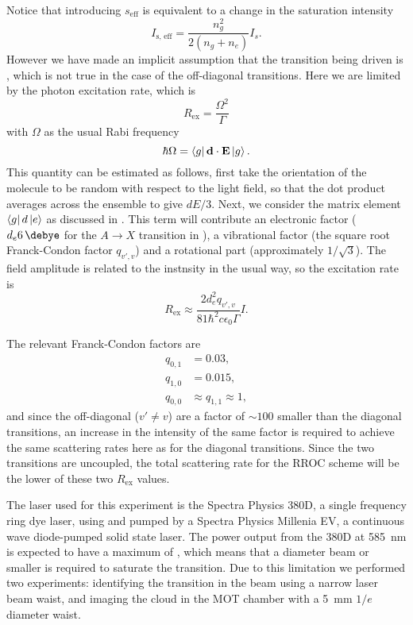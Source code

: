Notice that introducing $s_\text{eff}$ is equivalent to a change in the
saturation intensity
%
\begin{equation}
  I_\text{s, eff} = \frac{n_g^2}{2(n_g + n_e)}I_s.
\end{equation}
%
However we have made an implicit assumption that the transition being driven is
, which is not true in the case of the
off-diagonal transitions. Here we are limited by the photon excitation rate,
which is
%
\begin{equation}
  R_\text{ex} = \frac{\Omega^2}{\Gamma}
\end{equation}
%
with $\Omega$ as the usual Rabi frequency
%
\begin{equation}
  \hbar \Omega = \bra{g}\mathbf{d}\cdot\mathbf{E}\ket{g}.
\end{equation}
%
%
This quantity can be estimated as follows, first take the orientation of the
molecule to be random with respect to the light field, so that the dot product
averages across the ensemble to give $dE/3$. Next, we consider the matrix
element $\bra{g}d\ket{e}$ as discussed in .
This term will contribute an electronic factor ($d_e\SI{6}{\debye}$
for the $A\rightarrow X$ transition in \CaF{}), a vibrational factor (the
square root Franck-Condon factor $q_{v',v}$) and a rotational part
(approximately $1/\sqrt{3}$). The field amplitude is related to the instnsity
in the usual way, so the excitation rate is
%
\begin{equation}
  R_\text{ex} \approx \frac{2 d_e^2 q_{v',v}}{81 \hbar^2 c \epsilon_0 \Gamma}I.
\end{equation}

The relevant Franck-Condon factors are
%
\begin{align}
  q_{0,1} &= 0.03,\\
  q_{1,0} &= 0.015,\\
  q_{0,0} &\approx q_{1,1} \approx 1,
\end{align}
%
and since the off-diagonal ($v' \neq v$) are a factor of $\sim100$ smaller than
the diagonal transitions, an increase in the intensity of the same factor is
required to achieve the same scattering rates here as for the diagonal
transitions. Since the two transitions are uncoupled, the total scattering rate
for the RROC scheme will be the lower of these two $R_\text{ex}$ values.

The  laser used for this experiment is the Spectra Physics 380D, a single
frequency ring dye laser, using  and pumped by a Spectra
Physics Millenia EV, a continuous wave diode-pumped solid state laser. The
power output from the 380D at
\SI{585}{\nano\meter} is expected to have a maximum of , which means
that a  diameter beam or smaller is required to saturate the transition.
Due to this limitation we performed two experiments: identifying the transition
in the \CaF{} beam using a narrow laser beam waist, and imaging the \CaF{}
cloud in the MOT chamber with a \SI{5}{\milli\meter} $1/e$ diameter waist.

